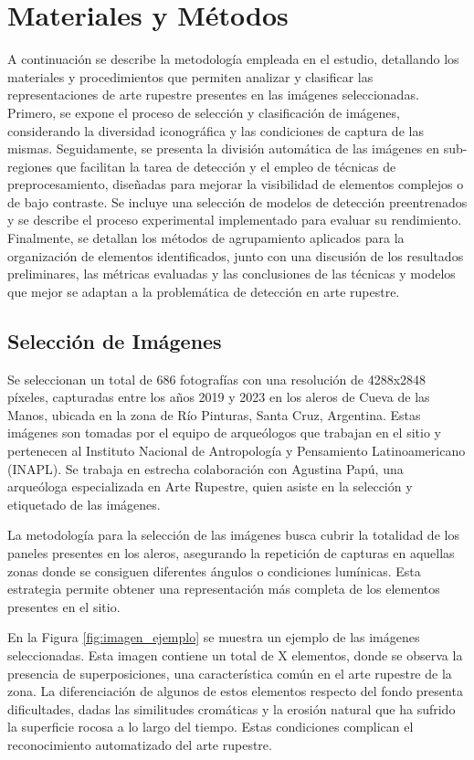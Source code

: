 \chapter{Materiales y Métodos}

A continuación se describe la metodología empleada en el estudio, detallando los materiales y procedimientos que permiten analizar y clasificar las representaciones de arte rupestre presentes en las imágenes seleccionadas. Primero, se expone el proceso de selección y clasificación de imágenes, considerando la diversidad iconográfica y las condiciones de captura de las mismas. Seguidamente, se presenta la división automática de las imágenes en sub-regiones que facilitan la tarea de detección y el empleo de técnicas de preprocesamiento, diseñadas para mejorar la visibilidad de elementos complejos o de bajo contraste. Se incluye una selección de modelos de detección preentrenados y se describe el proceso experimental implementado para evaluar su rendimiento. Finalmente, se detallan los métodos de agrupamiento aplicados para la organización de elementos identificados, junto con una discusión de los resultados preliminares, las métricas evaluadas y las conclusiones de las técnicas y modelos que mejor se adaptan a la problemática de detección en arte rupestre.

\section{Selección de Imágenes}
Se seleccionan un total de 686 fotografías con una resolución de 4288x2848 píxeles, capturadas entre los años 2019 y 2023 en los aleros de Cueva de las Manos, ubicada en la zona de Río Pinturas, Santa Cruz, Argentina. Estas imágenes son tomadas por el equipo de arqueólogos que trabajan en el sitio y pertenecen al Instituto Nacional de Antropología y Pensamiento Latinoamericano (INAPL). Se trabaja en estrecha colaboración con Agustina Papú, una arqueóloga especializada en Arte Rupestre, quien asiste en la selección y etiquetado de las imágenes.

La metodología para la selección de las imágenes busca cubrir la totalidad de los paneles presentes en los aleros, asegurando la repetición de capturas en aquellas zonas donde se consiguen diferentes ángulos o condiciones lumínicas. Esta estrategia permite obtener una representación más completa de los elementos presentes en el sitio.

En la Figura \ref{fig:imagen_ejemplo} se muestra un ejemplo de las imágenes seleccionadas. Esta imagen contiene un total de X elementos, donde se observa la presencia de superposiciones, una característica común en el arte rupestre de la zona. La diferenciación de algunos de estos elementos respecto del fondo presenta dificultades, dadas las similitudes cromáticas y la erosión natural que ha sufrido la superficie rocosa a lo largo del tiempo. Estas condiciones complican el reconocimiento automatizado del arte rupestre.


